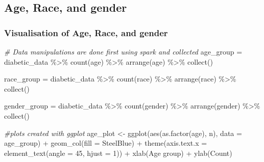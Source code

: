 \documentclass[
]{article}
\newenvironment{Shaded}{\begin{snugshade}}{\end{snugshade}}
\newcommand{\AttributeTok}[1]{\textcolor[rgb]{0.77,0.63,0.00}{#1}}
\newcommand{\CommentTok}[1]{\textcolor[rgb]{0.56,0.35,0.01}{\textit{#1}}}
\newcommand{\DecValTok}[1]{\textcolor[rgb]{0.00,0.00,0.81}{#1}}
\newcommand{\FunctionTok}[1]{\textcolor[rgb]{0.00,0.00,0.00}{#1}}
\newcommand{\NormalTok}[1]{#1}
\newcommand{\OtherTok}[1]{\textcolor[rgb]{0.56,0.35,0.01}{#1}}
\newcommand{\SpecialCharTok}[1]{\textcolor[rgb]{0.00,0.00,0.00}{#1}}
\newcommand{\StringTok}[1]{\textcolor[rgb]{0.31,0.60,0.02}{#1}}
\begin{document}
\hypertarget{age-race-and-gender}{%
\subsection{Age, Race, and gender}\label{age-race-and-gender}}

\hypertarget{visualisation-of-age-race-and-gender}{%
\subsubsection{Visualisation of Age, Race, and
gender}\label{visualisation-of-age-race-and-gender}}

\begin{Shaded}
\begin{Highlighting}[]
\CommentTok{\# Data manipulations are done first using spark and collected}
\NormalTok{age\_group }\OtherTok{=}\NormalTok{ diabetic\_data }\SpecialCharTok{\%\textgreater{}\%} 
  \FunctionTok{count}\NormalTok{(age) }\SpecialCharTok{\%\textgreater{}\%}
  \FunctionTok{arrange}\NormalTok{(age) }\SpecialCharTok{\%\textgreater{}\%}
  \FunctionTok{collect}\NormalTok{()}

\NormalTok{race\_group }\OtherTok{=}\NormalTok{ diabetic\_data }\SpecialCharTok{\%\textgreater{}\%} 
  \FunctionTok{count}\NormalTok{(race) }\SpecialCharTok{\%\textgreater{}\%}
  \FunctionTok{arrange}\NormalTok{(race) }\SpecialCharTok{\%\textgreater{}\%}
  \FunctionTok{collect}\NormalTok{()}

\NormalTok{gender\_group }\OtherTok{=}\NormalTok{ diabetic\_data }\SpecialCharTok{\%\textgreater{}\%} 
  \FunctionTok{count}\NormalTok{(gender) }\SpecialCharTok{\%\textgreater{}\%}
  \FunctionTok{arrange}\NormalTok{(gender) }\SpecialCharTok{\%\textgreater{}\%}
  \FunctionTok{collect}\NormalTok{()}


\CommentTok{\#plots created with ggplot}
\NormalTok{age\_plot }\OtherTok{\textless{}{-}} 
  \FunctionTok{ggplot}\NormalTok{(}\FunctionTok{aes}\NormalTok{(}\FunctionTok{as.factor}\NormalTok{(age), n), }\AttributeTok{data =}\NormalTok{ age\_group) }\SpecialCharTok{+}
  \FunctionTok{geom\_col}\NormalTok{(}\AttributeTok{fill =} \StringTok{\textquotesingle{}SteelBlue\textquotesingle{}}\NormalTok{) }\SpecialCharTok{+}
  \FunctionTok{theme}\NormalTok{(}\AttributeTok{axis.text.x =} \FunctionTok{element\_text}\NormalTok{(}\AttributeTok{angle =} \DecValTok{45}\NormalTok{, }\AttributeTok{hjust =} \DecValTok{1}\NormalTok{)) }\SpecialCharTok{+}
  \FunctionTok{xlab}\NormalTok{(}\StringTok{\textquotesingle{}Age group\textquotesingle{}}\NormalTok{) }\SpecialCharTok{+}
  \FunctionTok{ylab}\NormalTok{(}\StringTok{\textquotesingle{}Count\textquotesingle{}}\NormalTok{)}


\end{Highlighting}
\end{Shaded}
\end{document}
